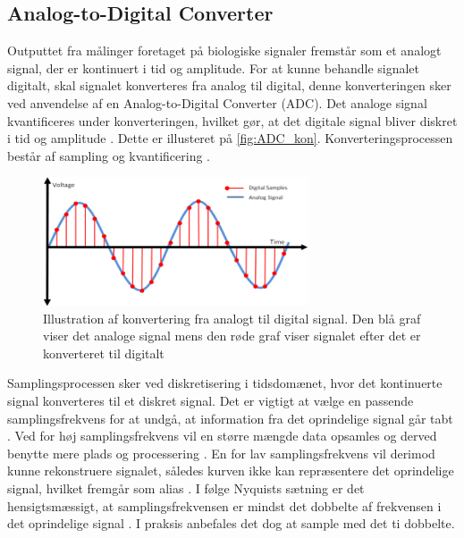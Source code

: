 \subsection{Analog-to-Digital Converter} \label{sec:ADC_teori}
Outputtet fra målinger foretaget på biologiske signaler fremstår som et analogt signal, der er kontinuert i tid og amplitude. For at kunne behandle signalet digitalt, skal signalet konverteres fra analog til digital, denne konverteringen sker ved anvendelse af en Analog-to-Digital Converter (ADC). Det analoge signal kvantificeres under konverteringen, hvilket gør, at det digitale signal bliver diskret i tid og amplitude \citep{webster1998}. Dette er illusteret på \autoref{fig:ADC_kon}. Konverteringsprocessen består af sampling og kvantificering \citep{morre2003}. 

\begin{figure}[H]
\centering
\includegraphics[width=0.7\textwidth]{figures/problemloesning/adc}
\caption{Illustration af konvertering fra analogt til digital signal. Den blå graf viser det analoge signal mens den røde graf viser signalet efter det er konverteret til digitalt}
\label{fig:ADC_kon}
\end{figure}

\noindent
Samplingsprocessen sker ved diskretisering i tidsdomænet, hvor det kontinuerte signal konverteres til et diskret signal. Det er vigtigt at vælge en passende samplingsfrekvens for at undgå, at information fra det oprindelige signal går tabt \citep{morre2003}. Ved for høj samplingsfrekvens vil en større mængde data opsamles og derved benytte mere plads og processering \citep{wolf2004}. En for lav samplingsfrekvens vil derimod kunne rekonstruere signalet, således kurven ikke kan repræsentere det oprindelige signal, hvilket fremgår som alias \citep{morre2003}. I følge Nyquists sætning er det hensigtsmæssigt, at samplingsfrekvensen er mindst det dobbelte af frekvensen i det oprindelige signal \citep{morre2003}. I praksis anbefales det dog at sample med det ti dobbelte.

